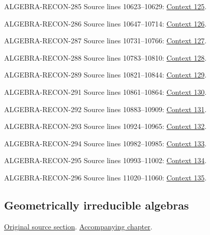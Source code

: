 \begin{AlgebraSourceRoutes}
\item[ALGEBRA-RECON-285] Source lines 10623--10629: \hyperlink{algebra-context-125}{Context 125}.
\item[ALGEBRA-RECON-286] Source lines 10647--10714: \hyperlink{algebra-context-126}{Context 126}.
\item[ALGEBRA-RECON-287] Source lines 10731--10766: \hyperlink{algebra-context-127}{Context 127}.
\item[ALGEBRA-RECON-288] Source lines 10783--10810: \hyperlink{algebra-context-128}{Context 128}.
\item[ALGEBRA-RECON-289] Source lines 10821--10844: \hyperlink{algebra-context-129}{Context 129}.
\item[ALGEBRA-RECON-291] Source lines 10861--10864: \hyperlink{algebra-context-130}{Context 130}.
\item[ALGEBRA-RECON-292] Source lines 10883--10909: \hyperlink{algebra-context-131}{Context 131}.
\item[ALGEBRA-RECON-293] Source lines 10924--10965: \hyperlink{algebra-context-132}{Context 132}.
\item[ALGEBRA-RECON-294] Source lines 10982--10985: \hyperlink{algebra-context-133}{Context 133}.
\item[ALGEBRA-RECON-295] Source lines 10993--11002: \hyperlink{algebra-context-134}{Context 134}.
\item[ALGEBRA-RECON-296] Source lines 11020--11060: \hyperlink{algebra-context-135}{Context 135}.
\end{AlgebraSourceRoutes}

\subsection{Geometrically irreducible algebras}
\hypertarget{algebra-source-section-algebras-over-fields}{}
\noindent\href{https://github.com/stacks/stacks-project/blob/a04446e57ec1fbc252a871afcec7752fb2807b14/algebra.tex\#L11073}{Original source section}. \href{algebra.pdf\#nameddest=section-algebras-over-fields}{Accompanying chapter}.

